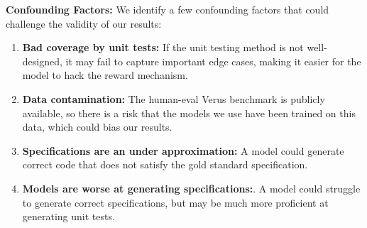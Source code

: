 \documentclass[11pt]{article}
\begin{document}
\textbf{Confounding Factors:} We identify a few confounding factors that could challenge the validity of our results:

\begin{enumerate}
    \item \textbf{Bad coverage by unit tests:} If the unit testing method is not well-designed, it may fail to capture important edge cases, making it easier for the model to hack the reward mechanism.
    \item \textbf{Data contamination:} The human-eval Verus benchmark is publicly available, so there is a risk that the models we use have been trained on this data, which could bias our results. 
    \item \textbf{Specifications are an under approximation:} A model could generate correct code that does not satisfy the gold standard specification.
    \item \textbf{Models are worse at generating specifications:}. A model could struggle to generate correct specifications, but may be much more proficient
    at generating unit tests.
\end{enumerate}



\end{document}

